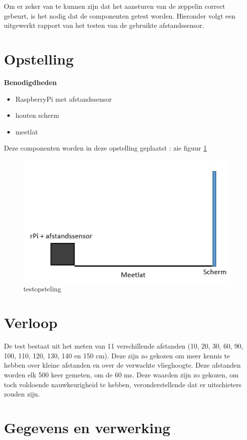 \documentclass{peno-opdracht3}
\begin{document}
\maketitle
Om er zeker van te kunnen zijn dat het aansturen van de zeppelin correct gebeurt, is het nodig dat de componenten getest worden. Hieronder volgt een uitgewerkt rapport van het testen van de gebruikte afstandssensor.\\
\section{Opstelling}
\textbf{Benodigdheden}
\begin{itemize}
	\item RaspberryPi met afstandssensor
	\item houten scherm
	\item meetlat
\end{itemize}
Deze componenten worden in deze opstelling geplaatst : zie figuur \ref{opstelling}
\begin{figure}[ht!]%
\centering
\includegraphics[scale=0.6]{opstelling.jpg}%
\caption{testopsteling}%
\label{opstelling}%
\end{figure}
\section{Verloop}
De test bestaat uit het meten van 11 verschillende afstanden (10, 20, 30, 60, 90, 100, 110, 120, 130, 140 en 150 cm). Deze zijn zo gekozen om meer kennis te hebben over kleine afstanden en over de verwachte vlieghoogte. Deze afstanden worden elk 500 keer gemeten, om de 60 ms. Deze waarden zijn zo gekozen, om toch voldoende nauwkeurigheid te hebben, veronderstellende dat er uitschieters zouden zijn. 

\section{Gegevens en verwerking}
\end{document}
